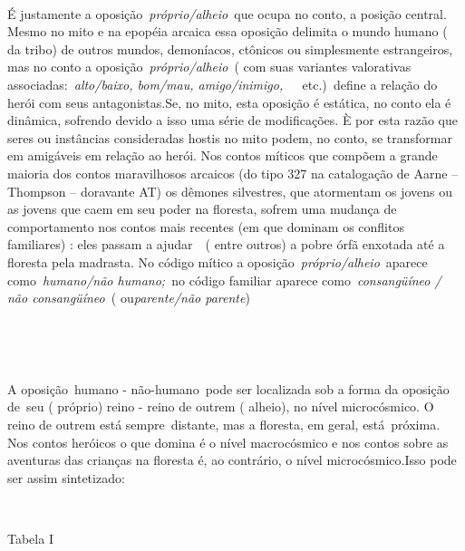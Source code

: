 ~

É justamente a oposição~\emph{próprio/alheio}~que ocupa no conto, a
posição central. Mesmo no mito e na epopéia arcaica essa oposição
delimita o mundo humano ( da tribo) de outros mundos, demoníacos,
ctônicos ou simplesmente estrangeiros, mas no conto a
oposição~\emph{próprio/alheio}~( com suas variantes valorativas
associadas:~\emph{alto/baixo, bom/mau,
amigo/inimigo,~~}~etc.)\emph{~}define a relação do herói com seus
antagonistas.Se, no mito, esta oposição é estática, no conto ela é
dinâmica, sofrendo devido a isso uma série de modificações. È por esta
razão que seres ou instâncias consideradas hostis no mito podem, no
conto, se transformar em amigáveis em relação ao herói. Nos contos
míticos que compõem a grande maioria dos contos maravilhosos arcaicos
(do tipo 327 na catalogação de Aarne --Thompson -- doravante AT) os
dêmones silvestres, que atormentam os jovens ou as jovens que caem em
seu poder na floresta, sofrem uma mudança de comportamento nos contos
mais recentes (em que dominam os conflitos familiares) : eles passam a
ajudar~~( entre outros) a pobre órfã enxotada até a floresta pela
madrasta. No código mítico a oposição~\emph{próprio/alheio}~aparece
como~\emph{humano/não humano;~}no código familiar aparece
como~\emph{consangüíneo / não consangüíneo~}( ou\emph{parente/não
parente})

~

~

A oposição~{humano - não-humano}~pode ser localizada sob a forma da
oposição de~{seu ( próprio) reino - reino de outrem ( alheio)}, no nível
microcósmico. O reino de outrem está sempre~{distante}, mas a floresta,
em geral, está~{próxima}. Nos contos heróicos o que domina é o nível
macrocósmico e nos contos sobre as aventuras das crianças na floresta é,
ao contrário, o nível microcósmico.Isso pode ser assim sintetizado:

~

Tabela I

%
%
%
%
~

